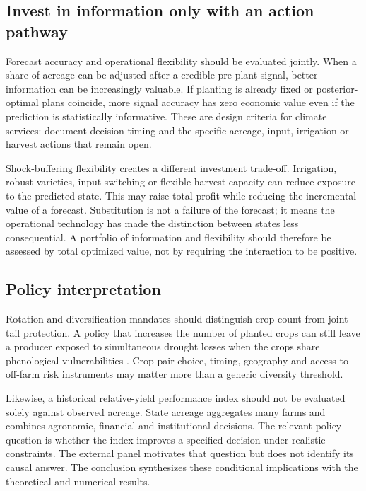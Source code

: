 \subsection{Invest in information only with an action pathway}

Forecast accuracy and operational flexibility should be evaluated jointly.
When a share of acreage can be adjusted after a credible pre-plant signal,
better information can be increasingly valuable. If planting is already fixed
or posterior-optimal plans coincide, more signal accuracy has zero
economic value even if the prediction is statistically informative. These
are design criteria for climate services: document decision timing and the
specific acreage, input, irrigation or harvest actions that remain open.

Shock-buffering flexibility creates a different investment trade-off.
Irrigation, robust varieties, input switching or flexible harvest capacity can
reduce exposure to the predicted state. This may raise total profit while
reducing the incremental value of a forecast. Substitution is not a failure of
the forecast; it means the operational technology has made the distinction
between states less consequential. A portfolio of information and flexibility
should therefore be assessed by total optimized value, not by requiring the
interaction to be positive.

\subsection{Policy interpretation}

Rotation and diversification mandates should distinguish crop count from
joint-tail protection. A policy that increases the number of planted crops can
still leave a producer exposed to simultaneous drought losses when the crops
share phenological vulnerabilities \citep{schmitt2024drought}. Crop-pair
choice, timing, geography and access to off-farm risk instruments may matter
more than a generic diversity threshold.

Likewise, a historical relative-yield performance index should not be
evaluated solely against observed acreage. State acreage aggregates many farms
and combines agronomic, financial and institutional decisions. The relevant
policy question is whether the index improves a specified decision under
realistic constraints. The external panel motivates that question but does not
identify its causal answer. The conclusion synthesizes these conditional
implications with the theoretical and numerical results.
